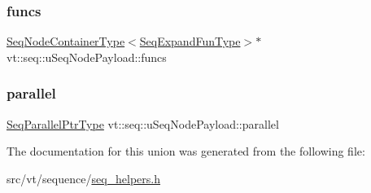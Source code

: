 \mbox{\label{unionvt_1_1seq_1_1u_seq_node_payload_ae29c56313f829840c64f9712fd457f5e}} 
\subsubsection{\texorpdfstring{funcs}{funcs}}
{\footnotesize\ttfamily \hyperlink{namespacevt_1_1seq_ad2b106b952becc168d3c567411ebf899}{Seq\+Node\+Container\+Type}$<$\hyperlink{namespacevt_1_1seq_ab345c700c06d135cafba39f711767ad5}{Seq\+Expand\+Fun\+Type}$>$$\ast$ vt\+::seq\+::u\+Seq\+Node\+Payload\+::funcs}

\mbox{\label{unionvt_1_1seq_1_1u_seq_node_payload_a82cfe4fb82709cc917dc36a41446d491}} 
\subsubsection{\texorpdfstring{parallel}{parallel}}
{\footnotesize\ttfamily \hyperlink{namespacevt_1_1seq_a050106112a0717f8e482465957fb2bfe}{Seq\+Parallel\+Ptr\+Type} vt\+::seq\+::u\+Seq\+Node\+Payload\+::parallel}



The documentation for this union was generated from the following file\+:\begin{DoxyCompactItemize}
\item 
src/vt/sequence/\hyperlink{seq__helpers_8h}{seq\+\_\+helpers.\+h}\end{DoxyCompactItemize}
